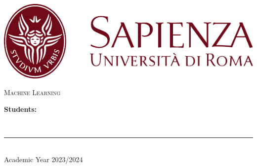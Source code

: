 \begin{titlepage}
	\centering
    \vspace*{0.5 cm}
    \includegraphics[scale = 0.75]{figures/SapienzaLogo.pdf}\\[1.0 cm]	%


    { \fontsize{20.74pt}{18.5pt}\selectfont\bfseries \thetitle \par } %

    \vspace*{0.25cm}
    \textsc{\Large Machine Learning}\\[0.5 cm] %

    \vspace*{2.6cm}
	\begin{minipage}{0.3\textwidth} %
		\begin{flushright} \large
		\begin{minipage}{1\textwidth}
		\begin{flushleft} \large
			\textbf{Students:} \\
			\theauthor
        \end{flushleft}
        \end{minipage}
		\end{flushright}
	\end{minipage}\\[3.85 cm]

    \vspace{2cm}
    \rule{\linewidth}{0.2 mm} \\[0.3 cm]
    \vspace*{-0.2cm}
    Academic Year 2023/2024
\end{titlepage}